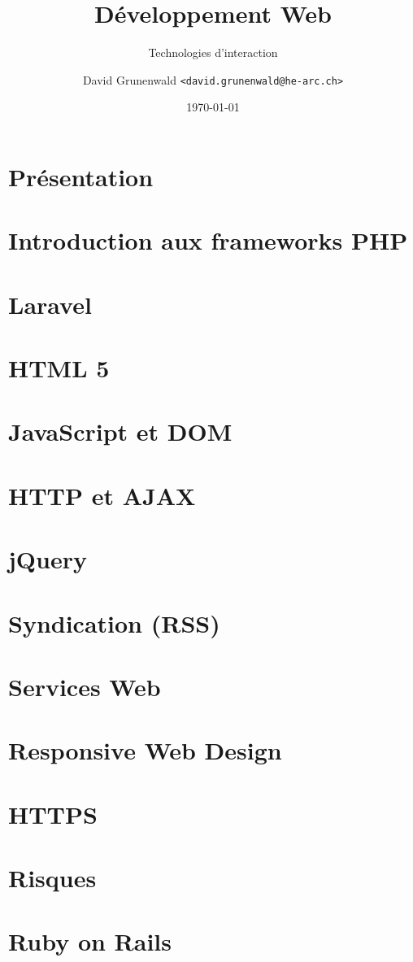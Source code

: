 \documentclass[a4paper,12pt]{scrbook}
\title{Développement Web}
\subtitle{Technologies d'interaction}
\author{%
    David Grunenwald \texttt{<david.grunenwald@he-arc.ch>}}
\date{\today}
\begin{document}
\maketitle

\tableofcontents

\chapter{ Présentation}


\chapter{ Introduction aux frameworks PHP}


\chapter{ Laravel}


\chapter{ HTML 5}


\chapter{ JavaScript et DOM}


\chapter{ HTTP et AJAX}


\chapter{ jQuery}


\chapter{ Syndication (RSS)}


\chapter{ Services Web}


\chapter{ Responsive Web Design}


\chapter{ HTTPS}


\chapter{ Risques}


\chapter{ Ruby on Rails}

\end{document}

